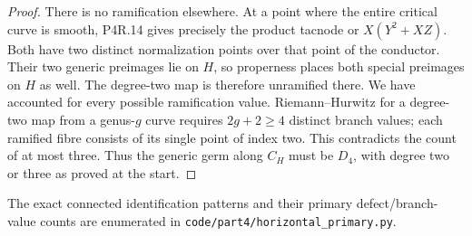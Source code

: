 \begin{proof}
There is no ramification elsewhere. At a point where the
entire critical curve is smooth, P4R.14 gives precisely
the product tacnode or $X(Y^2+XZ)$. Both have two distinct
normalization points over that point of the conductor.
Their two generic preimages lie on $H$, so properness
places both special preimages on $H$ as well. The
degree-two map is therefore unramified there. We have
accounted for every possible ramification value.
Riemann--Hurwitz for a degree-two map from a genus-$g$
curve requires $2g+2\ge4$ distinct branch values; each
ramified fibre consists of its single point of index two.
This contradicts the count of at most three. Thus the
generic germ along $C_H$ must be $D_4$, with degree two
or three as proved at the start.
\end{proof}

The exact connected identification patterns and their primary
defect/branch-value counts are enumerated in
\texttt{code/part4/horizontal\_primary.py}.
